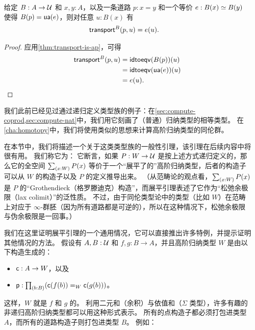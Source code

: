 \begin{lem}\label{thm:transport-is-given}
  给定 $B:A\to\mathcal{U}$ 和 $x,y:A$，以及一条道路 $p:x=y$ 和一个等价 $e:B(x) \simeq B(y)$ 使得 ${B}\mathopen{}\left({p}\right)\mathclose{} = \mathsf{ua}(e)$，则对任意 $u:B(x)$ 有
  \begin{align*}
    \mathsf{transport}^{B}(p,u) &= e(u).
  \end{align*}
\end{lem}

\begin{proof}
  应用\cref{thm:transport-is-ap}，可得
  \begin{align*}
    \mathsf{transport}^{B}(p,u) &= \mathsf{idtoeqv}({B}\mathopen{}\left({p}\right)\mathclose{})(u)\\
    &= \mathsf{idtoeqv}(\mathsf{ua}(e))(u)\\
    &= e(u).\qedhere
  \end{align*}
\end{proof}

我们此前已经见过通过递归定义类型族的例子：在\cref{sec:compute-coprod,sec:compute-nat}中，我们用它刻画了（普通）归纳类型的相等类型。
在\cref{cha:homotopy}中，我们将使用类似的思想来计算高阶归纳类型的同伦群。

在本节中，我们将描述一个关于这类类型族的一般性引理，该引理在后续内容中将很有用。
我们称它为：
%
%
它断言，如果 $P:W\to\mathcal{U}$ 是按上述方式递归定义的，那么它的全空间 $\sm{x:W} P(x)$ 等价于一个``展平了的''高阶归纳类型，后者的构造子可以从 $W$ 的构造子以及 $P$ 的定义推导出来。
（从范畴论的观点看，$\sm{x:W} P(x)$ 是 $P$ 的``Grothendieck（格罗滕迪克）构造''，而展平引理表述了它作为``松弛余极限（lax colimit）''的泛性质。
不过，由于同伦类型论中的类型（比如 $W$）在范畴上对应于 $\infty$-群胚（因为所有道路都是可逆的），所以在这种情况下，松弛余极限与伪余极限是一回事。）

我们在这里证明展平引理的一个通用情况，它可以直接推出许多特例，并提示证明其他情况的方法。
假设有 $A,B:\mathcal{U}$ 和 $f,g:B\to{}A$，并且高阶归纳类型 $W$ 是由以下构造生成的：


\begin{itemize}
\item $\mathsf{c}:A\to{}W$，以及
\item $\pp:\prd{b:B} (\cc(f(b))=_W\cc(g(b)))$。
\end{itemize}


这样，$W$ 就是 $f$ 和 $g$ 的。
%
%
利用二元和（余积）与依值和（$\Sigma$ 类型），许多有趣的非递归高阶归纳类型都可以用这种形式表示。
所有的点构造子都必须打包进类型 $A$，而所有的道路构造子则打包进类型 $B$。
例如：

